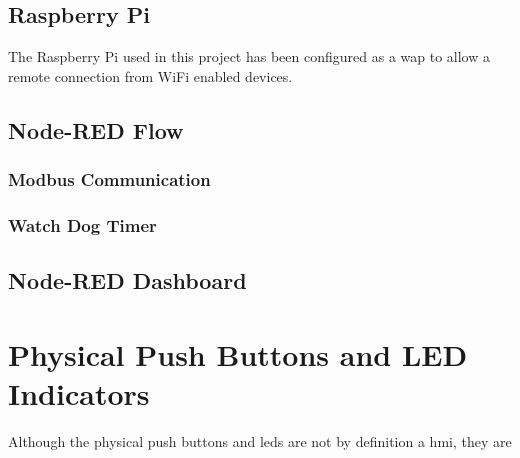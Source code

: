     \subsection{Raspberry Pi}
        The Raspberry Pi used in this project has been configured as a \acrshort{wap} to allow a remote connection from WiFi enabled devices. 
    
    \subsection{Node-RED Flow}
        \subsubsection{Modbus Communication}

        \subsubsection{Watch Dog Timer}
    
    \subsection{Node-RED Dashboard}

\section{Physical Push Buttons and LED Indicators}
    Although the physical push buttons and \acrshort{led}s are not by definition a \acrshort{hmi}, they are  
    
    
